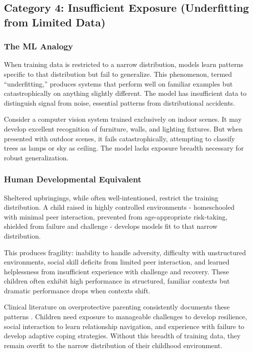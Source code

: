 \documentclass{article}
\begin{document}
\subsection{Category 4: Insufficient Exposure (Underfitting from Limited Data)}

\subsubsection{The ML Analogy}

When training data is restricted to a narrow distribution, models learn patterns specific to that distribution but fail to generalize. This phenomenon, termed ``underfitting,'' produces systems that perform well on familiar examples but catastrophically on anything slightly different. The model has insufficient data to distinguish signal from noise, essential patterns from distributional accidents.

Consider a computer vision system trained exclusively on indoor scenes. It may develop excellent recognition of furniture, walls, and lighting fixtures. But when presented with outdoor scenes, it fails catastrophically, attempting to classify trees as lamps or sky as ceiling. The model lacks exposure breadth necessary for robust generalization.

\subsubsection{Human Developmental Equivalent}

Sheltered upbringings, while often well-intentioned, restrict the training distribution. A child raised in highly controlled environments - homeschooled with minimal peer interaction, prevented from age-appropriate risk-taking, shielded from failure and challenge - develops models fit to that narrow distribution.

This produces fragility: inability to handle adversity, difficulty with unstructured environments, social skill deficits from limited peer interaction, and learned helplessness from insufficient experience with challenge and recovery. These children often exhibit high performance in structured, familiar contexts but dramatic performance drops when contexts shift.

Clinical literature on overprotective parenting consistently documents these patterns \cite{ungar2011}. Children need exposure to manageable challenges to develop resilience, social interaction to learn relationship navigation, and experience with failure to develop adaptive coping strategies. Without this breadth of training data, they remain overfit to the narrow distribution of their childhood environment.
\end{document}
